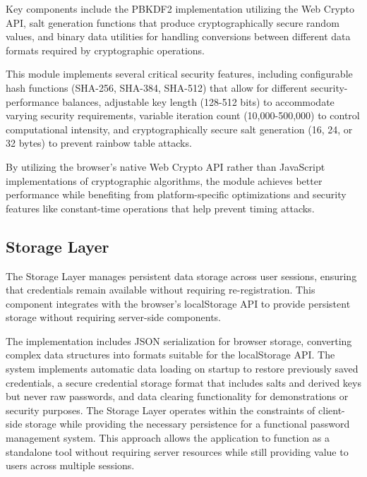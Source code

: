 \documentclass[11pt,a4paper]{article}
\begin{document}
Key components include the PBKDF2 implementation utilizing the Web Crypto API, salt generation functions that produce cryptographically secure random values, and binary data utilities for handling conversions between different data formats required by cryptographic operations.

This module implements several critical security features, including configurable hash functions (SHA-256, SHA-384, SHA-512) that allow for different security-performance balances, adjustable key length (128-512 bits) to accommodate varying security requirements, variable iteration count (10,000-500,000) to control computational intensity, and cryptographically secure salt generation (16, 24, or 32 bytes) to prevent rainbow table attacks.

By utilizing the browser's native Web Crypto API rather than JavaScript implementations of cryptographic algorithms, the module achieves better performance while benefiting from platform-specific optimizations and security features like constant-time operations that help prevent timing attacks.

\subsection{Storage Layer}
The Storage Layer manages persistent data storage across user sessions, ensuring that credentials remain available without requiring re-registration. This component integrates with the browser's localStorage API to provide persistent storage without requiring server-side components.

The implementation includes JSON serialization for browser storage, converting complex data structures into formats suitable for the localStorage API. The system implements automatic data loading on startup to restore previously saved credentials, a secure credential storage format that includes salts and derived keys but never raw passwords, and data clearing functionality for demonstrations or security purposes.
The Storage Layer operates within the constraints of client-side storage while providing the necessary persistence for a functional password management system. This approach allows the application to function as a standalone tool without requiring server resources while still providing value to users across multiple sessions.
\end{document}
